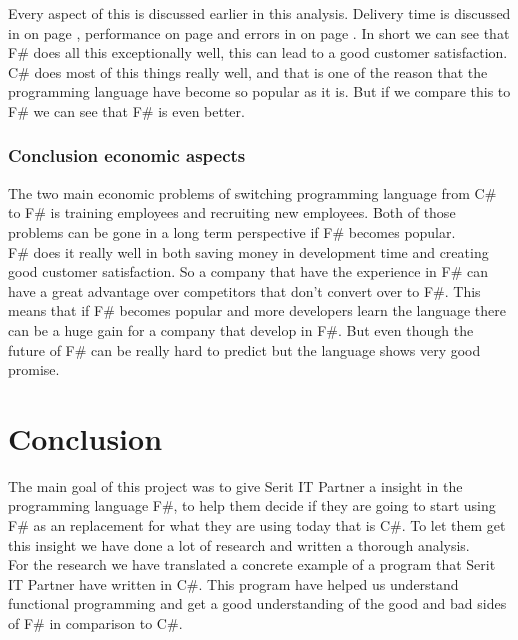 \documentclass[12pt, a4paper]{article}
\begin{document}
Every aspect of this is discussed earlier in this analysis. Delivery time is discussed in  on page \pageref{developmentTime}, performance on page \pageref{AnalysisPerformance} and errors in  on page \pageref{debug}. In short we can see that F\# does all this exceptionally well, this can lead to a good customer satisfaction.\\

C\# does most of this things really well, and that is one of the reason that the programming language have become so popular as it is. But if we compare this to F\# we can see that F\# is even better. 

\newpage
\subsubsection{Conclusion economic aspects}
The two main economic problems of switching programming language from C\# to F\# is training employees and recruiting new employees. Both of those problems can be gone in a long term perspective if F\# becomes popular.\\

F\# does it really well in both saving money in development time and creating good customer satisfaction.  So a company that have the experience in F\# can have a great advantage over competitors that don't convert over to F\#. This means that if F\# becomes popular and more developers learn the language there can be a huge gain for a company that develop in F\#. But even though the future of F\# can be really hard to predict but the language shows very good promise.

\newpage

\section{Conclusion}
The main goal of this project was to give Serit IT Partner a insight in the programming language F\#, to help them decide if they are going to start using F\# as an replacement for what they are using today that is C\#. To let them get this insight we have done a lot of research and written a thorough analysis.\\

For the research we have translated a concrete example of a program that Serit IT Partner have written in C\#. This program have helped us understand functional programming and get a good understanding of the good and bad sides of F\# in comparison to C\#.\\
\end{document}
